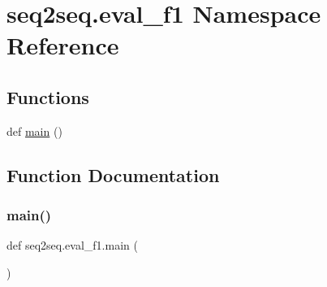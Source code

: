 \hypertarget{namespaceseq2seq_1_1eval__f1}{}\section{seq2seq.\+eval\+\_\+f1 Namespace Reference}
\label{namespaceseq2seq_1_1eval__f1}
\subsection*{Functions}
\begin{DoxyCompactItemize}
\item 
def \hyperlink{namespaceseq2seq_1_1eval__f1_a99ede4f55975fd62d1d5834b72fa03c7}{main} ()
\end{DoxyCompactItemize}


\subsection{Function Documentation}
\mbox{\label{namespaceseq2seq_1_1eval__f1_a99ede4f55975fd62d1d5834b72fa03c7}} 
\subsubsection{\texorpdfstring{main()}{main()}}
{\footnotesize\ttfamily def seq2seq.\+eval\+\_\+f1.\+main (\begin{DoxyParamCaption}{ }\end{DoxyParamCaption})}

